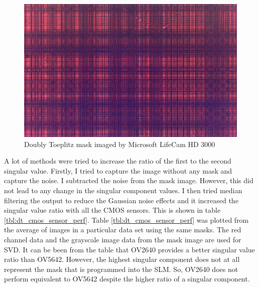 \begin{figure}[h]
\centering
\includegraphics[scale=0.25]{pics/slm/lifecamdtmask.png}
\caption{Doubly Toeplitz mask imaged by Microsoft LifeCam HD 3000}
\label{fig:dt_lifecam}
\end{figure}
A lot of methods were tried to increase the ratio of the first to the second singular value. Firstly, I tried to capture the image without any mask and capture the noise. I subtracted the noise from the mask image. However, this did not lead to any change in the singular component values. I then tried median filtering the output to reduce the Gaussian noise effects and it increased the singular value ratio with all the CMOS sensors. This is shown in table \ref{tbl:dt_cmos_sensor_perf}. Table \ref{tbl:dt_cmos_sensor_perf} was plotted from the average of images in a particular data set using the same masks. The red channel data and the grayscale image data from the mask image are used for SVD. 
It can be been from the table that OV2640 provides a better singular value ratio than OV5642. However, the highest singular component does not at all represent the mask that is programmed into the SLM. So, OV2640 does not perform equivalent to OV5642 despite the higher ratio of a singular component.
